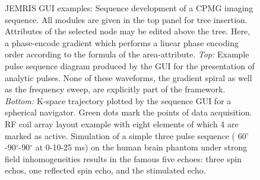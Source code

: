 \documentclass[journal,onecolumn,12pt]{IEEEtran}
\begin{document}
\begin{figure}
  \hfil
 \label{fig:guis}
 \caption{JEMRIS GUI examples:  Sequence development of a CPMG imaging sequence. All modules are given
   in the top panel for tree insertion. Attributes of the selected node may be edited above the tree. Here, a
   phase-encode gradient which performs a linear phase encoding order according to the formula of the
   area-attribute.  {\it Top:} Example pulse sequence diagram produced by the GUI for the presentation
   of analytic pulses. None of these waveforms, the gradient spiral as well as the frequency sweep, are explicitly part
   of the framework.   {\it Bottom:} K-space trajectory plotted by the sequence GUI for a spherical
   navigator. Green dots mark the points of data acquisition.  RF coil array layout example with eight
   elements of which 4 are marked as active.  Simulation of a simple three pulse sequence (
   60$^\circ$-90$^\circ$-90$^\circ$ at 0-10-25 ms) on the human brain phantom under strong field inhomogeneities results
   in the famous five echoes: three spin echos, one reflected spin echo, and the stimulated echo.}
\end{figure}

\end{document}

